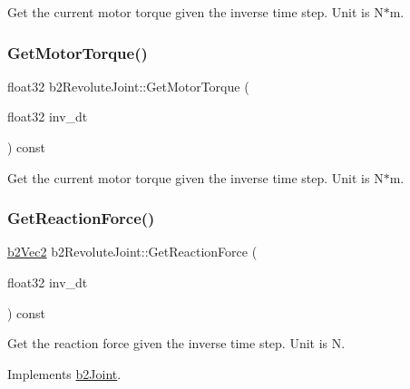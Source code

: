 Get the current motor torque given the inverse time step. Unit is N$\ast$m. \mbox{\label{classb2RevoluteJoint_a5abafb4d0c1df642f73a5d9faf615e26}} 
\subsubsection{\texorpdfstring{Get\+Motor\+Torque()}{GetMotorTorque()}\hspace{0.1cm}{\footnotesize\ttfamily [2/2]}}
{\footnotesize\ttfamily float32 b2\+Revolute\+Joint\+::\+Get\+Motor\+Torque (\begin{DoxyParamCaption}\item[{float32}]{inv\+\_\+dt }\end{DoxyParamCaption}) const}

Get the current motor torque given the inverse time step. Unit is N$\ast$m. \mbox{\label{classb2RevoluteJoint_a75d097d273af5f15994cfa5109039ac6}} 
\subsubsection{\texorpdfstring{Get\+Reaction\+Force()}{GetReactionForce()}\hspace{0.1cm}{\footnotesize\ttfamily [1/2]}}
{\footnotesize\ttfamily \hyperlink{structb2Vec2}{b2\+Vec2} b2\+Revolute\+Joint\+::\+Get\+Reaction\+Force (\begin{DoxyParamCaption}\item[{float32}]{inv\+\_\+dt }\end{DoxyParamCaption}) const\hspace{0.3cm}{\ttfamily [virtual]}}

Get the reaction force given the inverse time step. Unit is N. 

Implements \hyperlink{classb2Joint_a7e0eddefb9b69ad050b8ef6425838a74}{b2\+Joint}.

\mbox{\label{classb2RevoluteJoint_abeb7bf941589aed0d7f330a578a62024}} 
